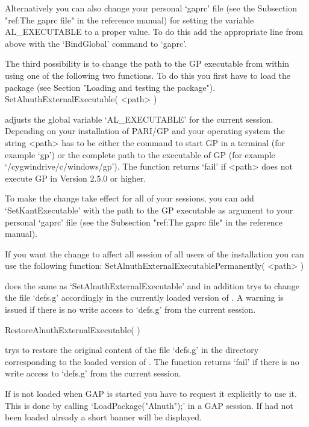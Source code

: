 Alternatively you can also change your personal `gaprc' file (see 
the Subsection "ref:The gaprc file" in the {\GAP} reference manual)
for setting the variable AL_EXECUTABLE to a proper value. To do this
add the appropriate line from above with the `BindGlobal' command to
`gaprc'.

The third possibility is to change the path to the GP executable from
within {\GAP} using one of the following two functions. To do this you
first have to load the package (see Section "Loading and testing the
package").
\> SetAlnuthExternalExecutable( <path> )

adjusts the global variable `AL_EXECUTABLE' for the current {\GAP}
session. Depending on your installation of PARI/GP and your operating
system the string <path> has to be either the command to start GP in a
terminal (for example `gp') or the complete path to the executable of GP 
(for example `/cygwindrive/c/windows/gp'). The function returns `fail'
if <path> does not execute GP in Version 2.5.0 or higher.

To make the change take effect for all of your {\GAP} sessions, you can
add `SetKantExecutable' with the path to the GP executable as argument
to your personal `gaprc' file (see the Subsection "ref:The gaprc file"
in the {\GAP} reference manual). 

If you want the change to affect all {\GAP} session of all users of the
{\GAP} installation you can use the following function:
\> SetAlnuthExternalExecutablePermanently( <path> )

does the same as `SetAlnuthExternalExecutable' and in addition trys to
change the file `defs.g' accordingly in the currently loaded version
of {\Alnuth}. A warning is issued if there is no write access to `defs.g'
from the current {\GAP} session.

\> RestoreAlnuthExternalExecutable( )

trys to restore the original content of the file `defs.g' in the
directory corresponding to the loaded version of {\Alnuth}. The function
returns `fail' if there is no write access to `defs.g'
from the current {\GAP} session.


If {\Alnuth} is not loaded when GAP is started you have to request it
explicitly to use it. This is done by calling `LoadPackage("Alnuth");'
in a GAP session. If {\Alnuth} had not been loaded already a short
banner will be displayed.

